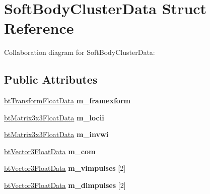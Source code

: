 \hypertarget{struct_soft_body_cluster_data}{\section{Soft\+Body\+Cluster\+Data Struct Reference}
\label{struct_soft_body_cluster_data}
}


Collaboration diagram for Soft\+Body\+Cluster\+Data\+:
\subsection*{Public Attributes}
\begin{DoxyCompactItemize}
\item 
\hypertarget{struct_soft_body_cluster_data_ae102876d093436233f3eb8b785bd53b6}{\hyperlink{structbt_transform_float_data}{bt\+Transform\+Float\+Data} {\bfseries m\+\_\+framexform}}\label{struct_soft_body_cluster_data_ae102876d093436233f3eb8b785bd53b6}

\item 
\hypertarget{struct_soft_body_cluster_data_aa7b4e9ec24613e7a66709fc5a8fde0bc}{\hyperlink{structbt_matrix3x3_float_data}{bt\+Matrix3x3\+Float\+Data} {\bfseries m\+\_\+locii}}\label{struct_soft_body_cluster_data_aa7b4e9ec24613e7a66709fc5a8fde0bc}

\item 
\hypertarget{struct_soft_body_cluster_data_a4794dc1bc3ec675d4cd50b549ca6b763}{\hyperlink{structbt_matrix3x3_float_data}{bt\+Matrix3x3\+Float\+Data} {\bfseries m\+\_\+invwi}}\label{struct_soft_body_cluster_data_a4794dc1bc3ec675d4cd50b549ca6b763}

\item 
\hypertarget{struct_soft_body_cluster_data_af9d1cbefb31e169319f5765620a489f3}{\hyperlink{structbt_vector3_float_data}{bt\+Vector3\+Float\+Data} {\bfseries m\+\_\+com}}\label{struct_soft_body_cluster_data_af9d1cbefb31e169319f5765620a489f3}

\item 
\hypertarget{struct_soft_body_cluster_data_a6052f3a630dfcb8211198f2556790804}{\hyperlink{structbt_vector3_float_data}{bt\+Vector3\+Float\+Data} {\bfseries m\+\_\+vimpulses} \mbox{[}2\mbox{]}}\label{struct_soft_body_cluster_data_a6052f3a630dfcb8211198f2556790804}

\item 
\hypertarget{struct_soft_body_cluster_data_aa73da44e7721f19bbf31580903f4a091}{\hyperlink{structbt_vector3_float_data}{bt\+Vector3\+Float\+Data} {\bfseries m\+\_\+dimpulses} \mbox{[}2\mbox{]}}\label{struct_soft_body_cluster_data_aa73da44e7721f19bbf31580903f4a091}


\end{DoxyCompactItemize}
